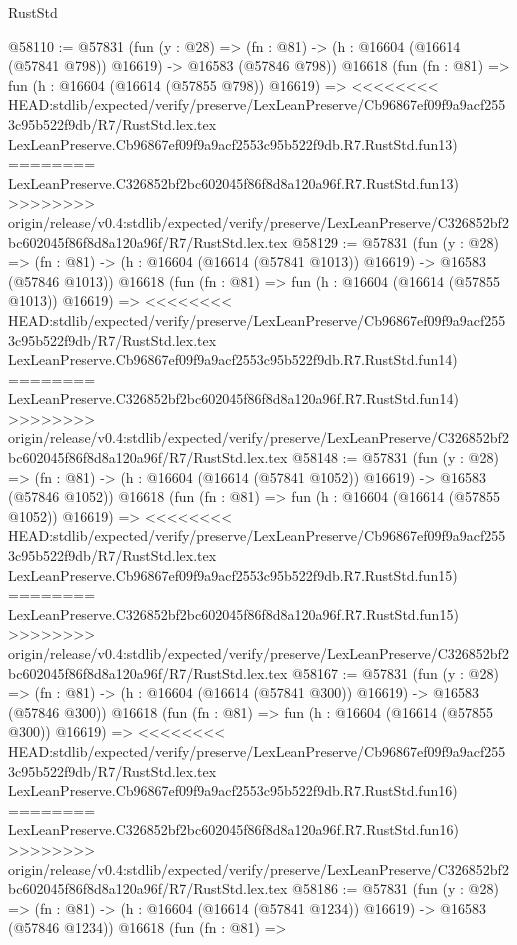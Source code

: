 \begin{lexlean}{RustStd}
\begin{coremodule}
{\begin{coremodule}
{{{{{{{{{{{{{{{{{{{{{{{{{{{{{{{{{{{{{{{{{{{{{{{{{{{{{{{@58110 := @57831
    (fun (y : @28) =>
    (fn : @81) -> (h : @16604 (@16614 (@57841 @798)) @16619) -> @16583 (@57846 @798))
    @16618
    (fun (fn : @81) =>
    fun (h : @16604 (@16614 (@57855 @798)) @16619) =>
<<<<<<<< HEAD:stdlib/expected/verify/preserve/LexLeanPreserve/Cb96867ef09f9a9acf2553c95b522f9db/R7/RustStd.lex.tex
    LexLeanPreserve.Cb96867ef09f9a9acf2553c95b522f9db.R7.RustStd.fun13)
========
    LexLeanPreserve.C326852bf2bc602045f86f8d8a120a96f.R7.RustStd.fun13)
>>>>>>>> origin/release/v0.4:stdlib/expected/verify/preserve/LexLeanPreserve/C326852bf2bc602045f86f8d8a120a96f/R7/RustStd.lex.tex
@58129 := @57831
    (fun (y : @28) =>
    (fn : @81) -> (h : @16604 (@16614 (@57841 @1013)) @16619) -> @16583 (@57846 @1013))
    @16618
    (fun (fn : @81) =>
    fun (h : @16604 (@16614 (@57855 @1013)) @16619) =>
<<<<<<<< HEAD:stdlib/expected/verify/preserve/LexLeanPreserve/Cb96867ef09f9a9acf2553c95b522f9db/R7/RustStd.lex.tex
    LexLeanPreserve.Cb96867ef09f9a9acf2553c95b522f9db.R7.RustStd.fun14)
========
    LexLeanPreserve.C326852bf2bc602045f86f8d8a120a96f.R7.RustStd.fun14)
>>>>>>>> origin/release/v0.4:stdlib/expected/verify/preserve/LexLeanPreserve/C326852bf2bc602045f86f8d8a120a96f/R7/RustStd.lex.tex
@58148 := @57831
    (fun (y : @28) =>
    (fn : @81) -> (h : @16604 (@16614 (@57841 @1052)) @16619) -> @16583 (@57846 @1052))
    @16618
    (fun (fn : @81) =>
    fun (h : @16604 (@16614 (@57855 @1052)) @16619) =>
<<<<<<<< HEAD:stdlib/expected/verify/preserve/LexLeanPreserve/Cb96867ef09f9a9acf2553c95b522f9db/R7/RustStd.lex.tex
    LexLeanPreserve.Cb96867ef09f9a9acf2553c95b522f9db.R7.RustStd.fun15)
========
    LexLeanPreserve.C326852bf2bc602045f86f8d8a120a96f.R7.RustStd.fun15)
>>>>>>>> origin/release/v0.4:stdlib/expected/verify/preserve/LexLeanPreserve/C326852bf2bc602045f86f8d8a120a96f/R7/RustStd.lex.tex
@58167 := @57831
    (fun (y : @28) =>
    (fn : @81) -> (h : @16604 (@16614 (@57841 @300)) @16619) -> @16583 (@57846 @300))
    @16618
    (fun (fn : @81) =>
    fun (h : @16604 (@16614 (@57855 @300)) @16619) =>
<<<<<<<< HEAD:stdlib/expected/verify/preserve/LexLeanPreserve/Cb96867ef09f9a9acf2553c95b522f9db/R7/RustStd.lex.tex
    LexLeanPreserve.Cb96867ef09f9a9acf2553c95b522f9db.R7.RustStd.fun16)
========
    LexLeanPreserve.C326852bf2bc602045f86f8d8a120a96f.R7.RustStd.fun16)
>>>>>>>> origin/release/v0.4:stdlib/expected/verify/preserve/LexLeanPreserve/C326852bf2bc602045f86f8d8a120a96f/R7/RustStd.lex.tex
@58186 := @57831
    (fun (y : @28) =>
    (fn : @81) -> (h : @16604 (@16614 (@57841 @1234)) @16619) -> @16583 (@57846 @1234))
    @16618
    (fun (fn : @81) =>
}}}}}}}}}}}}}}}}}}}}}}}}}}}}}}}}}}}}}}}}}}}}}}}}}}}}}}}
\end{coremodule}}
\end{coremodule}
\end{lexlean}
